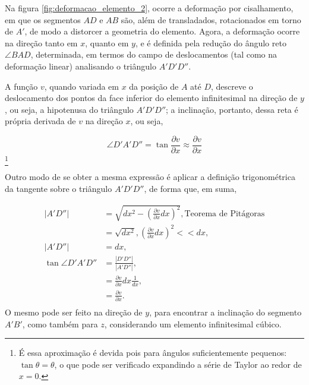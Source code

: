 Na figura \ref{fig:deformacao_elemento_2}, ocorre a deformação por cisalhamento, em que os segmentos $AD$ e $AB$ são, além de transladados, rotacionados em torno de $A'$, de modo a distorcer a geometria do elemento. Agora, a deformação ocorre na direção tanto em $x$, quanto em $y$, e é definida pela redução do ângulo reto $\angle BAD$, determinada, em termos do campo de deslocamentos (tal como na deformação linear) analisando o triângulo $A'D'D''$.

A função $v$, quando variada em $x$ da posição de $A$ até $D$, descreve o deslocamento dos pontos da face inferior do elemento infinitesimal na direção de $y$, ou seja, a hipotenusa do triângulo $A'D'D''$; a inclinação, portanto, dessa reta é própria derivada de $v$ na direção $x$, ou seja,

\begin{equation}
    \angle D'A'D'' = \tan{\frac{\partial v}{\partial x}} \approx \frac{\partial v}{\partial x}
\end{equation}\footnote{É essa aproximação é devida pois para ângulos suficientemente pequenos: $\tan \theta = \theta$, o que pode ser verificado expandindo a série de Taylor ao redor de $x=0$.}

Outro modo de se obter a mesma expressão é aplicar a definição trigonométrica da tangente sobre o triângulo $A'D'D''$, de forma que, em suma,

\begin{align}
    |A'D''|             &= \sqrt{dx^2 -  \left(\frac{\partial v}{\partial x}dx\right)^2}, \text{Teorema de Pitágoras}\\
                         &= \sqrt{dx^2}, \left(\frac{\partial v}{\partial x}dx\right)^2 << dx,\\
    |A'D''|              &= dx,\\
    \tan{\angle D'A'D''} &= \frac{|D'D''|}{|A'D''|}, \\
                         &= \frac{\partial v}{\partial x}dx \frac{1}{dx},\\
                         & = \frac{\partial v}{\partial x}.\\
\end{align}
O mesmo pode ser feito na direção de $y$, para encontrar a inclinação do segmento $A'B'$, como também para $z$, considerando um elemento infinitesimal cúbico.

